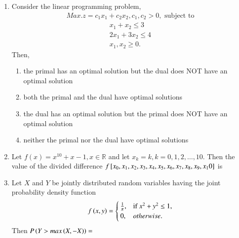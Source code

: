 \documentclass[journal]{IEEEtran}
\begin{document}
\begin{enumerate}
\item Consider the linear programming problem, 
\begin{align*}
    Max. z=c_1 x_1 + c_2 x_2, c_1, c_2>0, \text{ subject to}
\end{align*}
\begin{align*}    
    x_1+x_2 \leq 3\\
    2x_1+3x_2 \leq 4\\
    x_1,x_2 \geq 0.
\end{align*}
Then,
\begin{enumerate}
    \item the primal has an optimal solution but the dual does NOT have an optimal solution
    \item both the primal and the dual have optimal solutions 
    \item the dual has an optimal solution but the primal does NOT have an optimal solution
    \item neither the primal nor the dual have optimal solutions
\end{enumerate}

\item Let $f(x)=x^{10}+x-1, x \in \mathbb R$ and let $x_k=k, k=0,1,2,\dots,10$. Then the value of the divided difference $f{}\left[x_0,x_1,x_2,x_3,x_4,x_5,x_6,x_7,x_8,x_9,x_10\right]$ is
\begin{enumerate}
\end{enumerate}

\item Let $X$ and $Y$ be jointly distributed random variables having the joint probability density function
\begin{align*}
    f\left(x,y\right)= \begin{cases} 
\frac{1}{\pi}, & \text{if } x^2+y^2 \leq 1,\\
0, & otherwise. \\
\end{cases}
\end{align*}
Then $P\left(Y>max\left(X,-X\right)\right)=$
\begin{enumerate}
\end{enumerate}


\end{enumerate}
\end{document}
